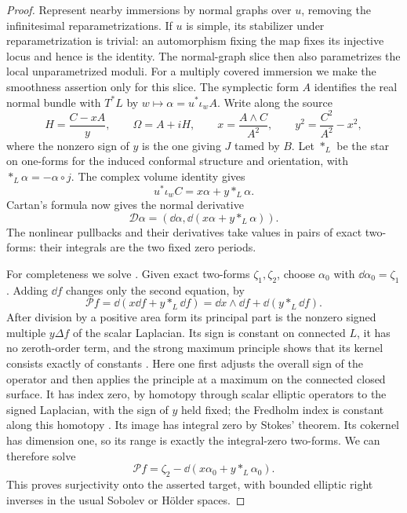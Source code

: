 \begin{proof}
Represent nearby immersions by normal graphs over $u$, removing the
infinitesimal reparametrizations.  If $u$ is simple, its stabilizer under
reparametrization is trivial: an automorphism fixing the map fixes its
injective locus and hence is the identity.  The normal-graph slice then
also parametrizes the local unparametrized moduli.  For a multiply
covered immersion we make the smoothness assertion only for this slice.
The symplectic form $A$ identifies the real normal bundle with $T^*L$
by $w\mapsto\alpha=u^*\iota_wA$.  Write along the source
\begin{equation}\label{eq:pencil-volume-normalization}
 H=\frac{C-xA}{y},\qquad \Omega=A+iH,\qquad
 x=\frac{A\wedge C}{A^2},\qquad
 y^2=\frac{C^2}{A^2}-x^2,
\end{equation}
where the nonzero sign of $y$ is the one giving $J$ tamed by $B$.
Let $*_L$ be the star on one-forms for the induced conformal structure
and orientation, with $*_L\alpha=-\alpha\circ j$.
The complex volume identity gives
\[
 u^*\iota_wC=x\alpha+y*_L\alpha.
\]
Cartan's formula now gives the normal derivative
\begin{equation}\label{eq:pencil-normal-operator}
 \mathcal D\alpha
   =\left(\dd\alpha,\dd(x\alpha+y*_L\alpha)\right).
\end{equation}
The nonlinear pullbacks and their derivatives take values in pairs
of exact two-forms: their integrals are the two fixed zero periods.

For completeness we solve .  Given
exact two-forms $\zeta_1,\zeta_2$, choose $\alpha_0$ with
$\dd\alpha_0=\zeta_1$.  Adding $\dd f$ changes only the second
equation, by
\begin{equation}\label{eq:pencil-scalar-operator}
 \mathcal P f
 =\dd(x\dd f+y*_L\dd f)
 =\dd x\wedge\dd f+\dd(y*_L\dd f).
\end{equation}
After division by a positive area form its principal part is the
nonzero signed multiple $y\Delta f$ of the scalar Laplacian.
Its sign is constant on connected $L$, it has no zeroth-order term,
and the strong maximum principle shows that its kernel consists exactly
of constants \cite[Chapter~1, Theorem~1.6]{KiselevRoquejoffreRyzhik2012}.
Here one first adjusts the overall sign of the operator and then applies
the principle at a maximum on the connected closed surface.
It has index zero, by homotopy through scalar elliptic operators to the
signed Laplacian, with the sign of $y$ held fixed; the Fredholm index is
constant along this homotopy
\cite[Section~7, Propositions~7.3--7.4]{TaylorFunctionalNotes}.
Its image has integral zero by Stokes' theorem.  Its cokernel has
dimension one, so its range is exactly the integral-zero two-forms.
We can therefore solve
\[
 \mathcal P f=\zeta_2-\dd(x\alpha_0+y*_L\alpha_0).
\]
This proves surjectivity onto the asserted target, with bounded
elliptic right inverses in the usual Sobolev or H\"older spaces.


\end{proof}
